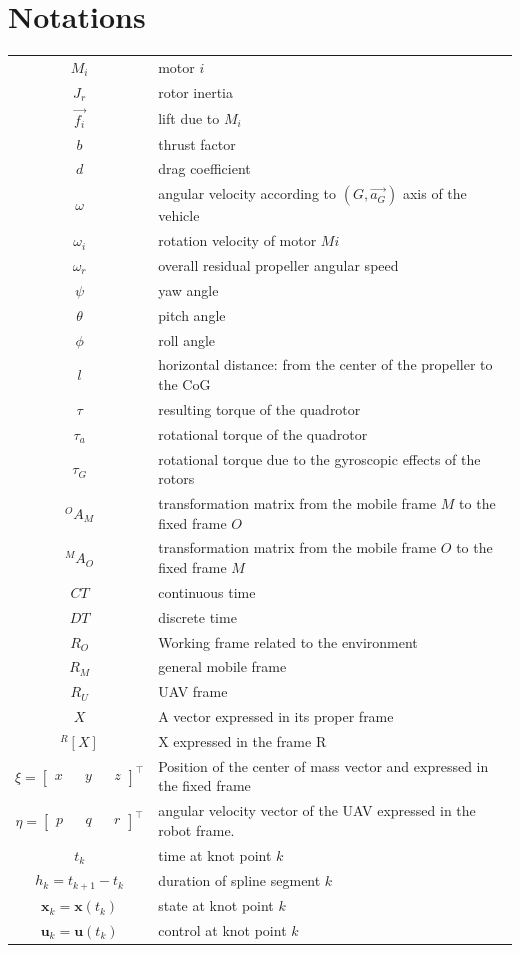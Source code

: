 \documentclass{thesisreport}
\begin{document}
 \section*{Notations}
 \begin{tabular}{cp{}}
 $M_i$ & motor $i$\\
 $J_r$ & rotor inertia\\
  $\overrightarrow{f_i}$ & lift due to $M_i$\\
  $b$ & thrust factor \\
  $d$ & drag coefficient \\
  $\omega$ & angular velocity according to $(G,  \overrightarrow{a_G})$ axis of the vehicle \\
$\omega_i$ & rotation velocity of motor $Mi$\\
$\omega_r$ & overall residual propeller angular speed\\
$\psi$ & yaw angle\\
$\theta$ & pitch angle\\  
  $\phi$ & roll angle\\
  $l$ & horizontal distance: from the center of the propeller to the CoG \\
  $\tau$ & resulting torque of the quadrotor\\
  $\tau_a$ & rotational torque of the quadrotor\\
  $\tau_G$ & rotational torque due to the gyroscopic effects of the rotors\\
  ${}^{O}A_M$ & transformation matrix from the mobile frame $M$ to the fixed frame $O$\\
  ${}^{M}A_O$ & transformation matrix from the mobile frame $O$ to the fixed frame $M$\\
  $CT$ & continuous time \\
  $DT$ & discrete time \\
  $R_O$ & Working frame related to the environment\\
  $R_M$ & general mobile frame\\
  $R_U$ & UAV frame\\
  $X$ & A vector expressed in its proper frame\\
  ${}^{R}[X]$ & X expressed in the frame R\\
  $\xi = \begin{bmatrix}
  x && y && z 
  \end{bmatrix}^{\intercal}$ & Position of the center of mass vector and expressed in the fixed frame\\
  $\eta = \begin{bmatrix}
  p && q && r
\end{bmatrix}^{\intercal}$ & angular velocity vector of the UAV expressed in the robot frame.\\
$t_k$ & time at knot point $k$\\
$h_k=t_{k+1} - t_k$ & duration of spline segment $k$\\
$\bm{x}_k=\bm{x}(t_k)$ & state at knot point $k$\\
$\bm{u}_k=\bm{u}(t_k)$ & control at knot point $k$\\


\end{tabular}\\
 
\end{document}
